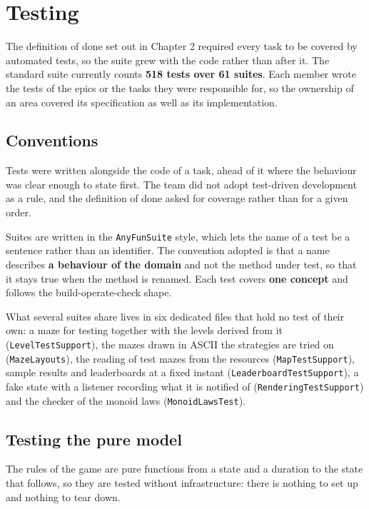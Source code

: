 \chapter{Testing}

The definition of done set out in Chapter 2 required every task to be covered by automated tests, so the suite grew
with the code rather than after it. The standard suite currently counts \textbf{518 tests over 61 suites}. Each
member wrote the tests of the epics or the tasks they were responsible for, so the ownership of an area covered its
specification as well as its implementation.

\section{Conventions}

Tests were written alongside the code of a task, ahead of it where the behaviour was clear enough to state first. The
team did not adopt test-driven development as a rule, and the definition of done asked for coverage rather than for a
given order.

Suites are written in the \texttt{AnyFunSuite} style, which lets the name of a test be a sentence rather than an
identifier. The convention adopted is that a name describes \textbf{a behaviour of the domain} and not the method under
test, so that it stays true when the method is renamed. Each test covers \textbf{one concept} and follows the
build-operate-check shape.

What several suites share lives in six dedicated files that hold no test of their own: a maze for testing together with
the levels derived from it (\texttt{LevelTestSupport}), the mazes drawn in ASCII the strategies are tried on
(\texttt{MazeLayouts}), the reading of test mazes from the resources (\texttt{MapTestSupport}), sample results and
leaderboards at a fixed instant (\texttt{LeaderboardTestSupport}), a fake state with a listener recording what it is
notified of (\texttt{RenderingTestSupport}) and the checker of the monoid laws (\texttt{MonoidLawsTest}).

\section{Testing the pure model}

The rules of the game are pure functions from a state and a duration to the state that follows, so they are tested
without infrastructure: there is nothing to set up and nothing to tear down.

